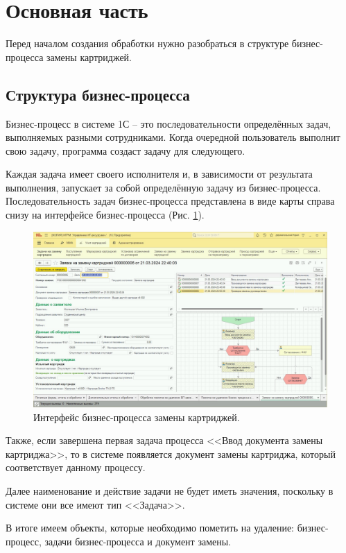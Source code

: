 \section{Основная часть}
    Перед началом создания обработки нужно разобраться в структуре бизнес-процесса замены картриджей.

    \subsection{Структура бизнес-процесса}
    Бизнес-процесс в системе 1С -- это последовательности определённых задач, выполняемых разными сотрудниками. Когда очередной пользователь выполнит свою задачу, программа создаст задачу для следующего.

    Каждая задача имеет своего исполнителя и, в зависимости от результата выполнения, запускает за собой определённую задачу из бизнес-процесса. Последовательность задач бизнес-процесса представлена в виде карты справа снизу на интерфейсе бизнес-процесса (Рис. \ref{process}).

    \begin{figure}[H]
        \centering
        \includegraphics[width=14cm]{pictures/process.png}
        \caption{Интерфейс бизнес-процесса замены картриджей.}  \label{process}
    \end{figure}

    Также, если завершена первая задача процесса <<Ввод документа замены картриджа>>, то в системе появляется документ замены картриджа, который соответствует данному процессу.

    Далее наименование и действие задачи не будет иметь значения, поскольку в системе они все имеют тип <<Задача>>.

    В итоге имеем объекты, которые необходимо пометить на удаление: бизнес-процесс, задачи бизнес-процесса и документ замены.

